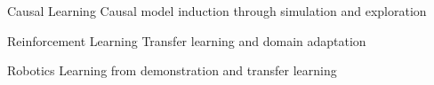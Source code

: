


\begin{cvskills}


\cvskill
{Causal Learning} %
{Causal model induction through simulation and exploration} %


\cvskill
{Reinforcement Learning} %
{Transfer learning and domain adaptation} %


\cvskill
{Robotics} %
{Learning from demonstration and transfer learning} %


\end{cvskills}